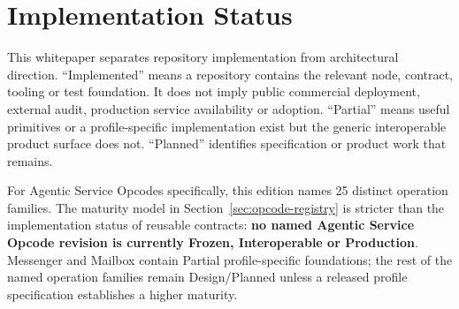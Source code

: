 \documentclass[11pt,oneside]{article}
\begin{document}
\section{Implementation Status}

This whitepaper separates repository implementation from architectural direction.
``Implemented'' means a repository contains the relevant node, contract, tooling or test
foundation. It does not imply public commercial deployment, external audit, production
service availability or adoption. ``Partial'' means useful primitives or a profile-specific
implementation exist but the generic interoperable product surface does not. ``Planned''
identifies specification or product work that remains.

For Agentic Service Opcodes specifically, this edition names 25 distinct operation families.
The maturity model in Section~\ref{sec:opcode-registry} is stricter than the implementation
status of reusable contracts: \textbf{no named Agentic Service Opcode revision is currently
Frozen, Interoperable or Production}. Messenger and Mailbox contain Partial profile-specific
foundations; the rest of the named operation families remain Design/Planned unless a released
profile specification establishes a higher maturity.
\end{document}
